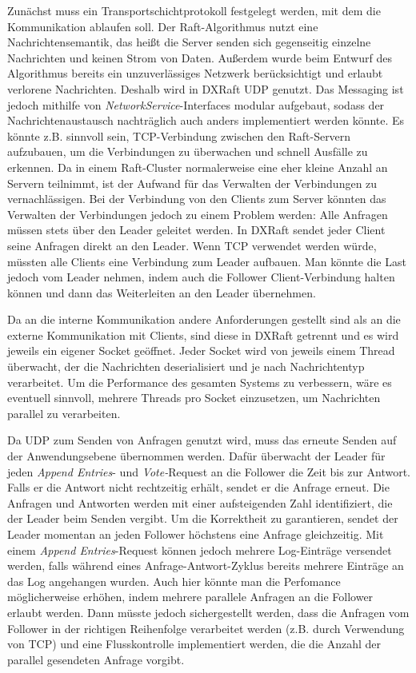 Zunächst muss ein Transportschichtprotokoll festgelegt werden, mit dem die Kommunikation ablaufen soll. 
Der Raft-Algorithmus nutzt eine Nachrichtensemantik, das heißt die Server senden sich gegenseitig einzelne Nachrichten und keinen Strom von Daten. Außerdem wurde beim Entwurf des Algorithmus bereits ein unzuverlässiges Netzwerk berücksichtigt und erlaubt verlorene Nachrichten. Deshalb wird in DXRaft UDP genutzt. Das Messaging ist jedoch mithilfe von \textit{NetworkService}-Interfaces modular aufgebaut, sodass der Nachrichtenaustausch nachträglich auch anders implementiert werden könnte. Es könnte z.B. sinnvoll sein, TCP-Verbindung zwischen den Raft-Servern aufzubauen, um die Verbindungen zu überwachen und schnell Ausfälle zu erkennen. Da in einem Raft-Cluster normalerweise eine eher kleine Anzahl an Servern teilnimmt, ist der Aufwand für das Verwalten der Verbindungen zu vernachlässigen. Bei der Verbindung von den Clients zum Server könnten das Verwalten der Verbindungen jedoch zu einem Problem werden: Alle Anfragen müssen stets über den Leader geleitet werden. In DXRaft sendet jeder Client seine Anfragen direkt an den Leader. Wenn TCP verwendet werden würde, müssten alle Clients eine Verbindung zum Leader aufbauen. Man könnte die Last jedoch vom Leader nehmen, indem auch die Follower Client-Verbindung halten können und dann das Weiterleiten an den Leader übernehmen. 

Da an die interne Kommunikation andere Anforderungen gestellt sind als an die externe Kommunikation mit Clients, sind diese in DXRaft getrennt und es wird jeweils ein eigener Socket geöffnet. Jeder Socket wird von jeweils einem Thread überwacht, der die Nachrichten deserialisiert und je nach Nachrichtentyp verarbeitet. Um die Performance des gesamten Systems zu verbessern, wäre es eventuell sinnvoll, mehrere Threads pro Socket einzusetzen, um Nachrichten parallel zu verarbeiten.

Da UDP zum Senden von Anfragen genutzt wird, muss das erneute Senden auf der Anwendungsebene übernommen werden. Dafür überwacht der Leader für jeden \textit{Append Entries}- und \textit{Vote-}Request an die Follower die Zeit bis zur Antwort. Falls er die Antwort nicht rechtzeitig erhält, sendet er die Anfrage erneut. Die Anfragen und Antworten werden mit einer aufsteigenden Zahl identifiziert, die der Leader beim Senden vergibt. Um die Korrektheit zu garantieren, sendet der Leader momentan an jeden Follower höchstens eine Anfrage gleichzeitig. Mit einem \textit{Append Entries}-Request können jedoch mehrere Log-Einträge versendet werden, falls während eines Anfrage-Antwort-Zyklus bereits mehrere Einträge an das Log angehangen wurden. Auch hier könnte man die Perfomance möglicherweise erhöhen, indem mehrere parallele Anfragen an die Follower erlaubt werden. Dann müsste jedoch sichergestellt werden, dass die Anfragen vom Follower in der richtigen Reihenfolge verarbeitet werden (z.B. durch Verwendung von TCP) und eine Flusskontrolle implementiert werden, die die Anzahl der parallel gesendeten Anfrage vorgibt.

